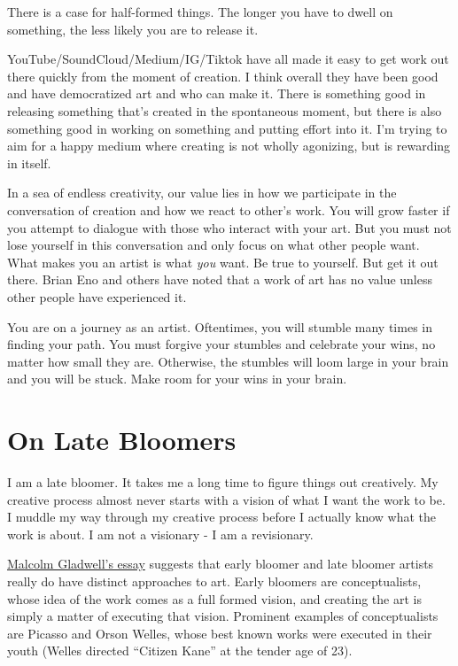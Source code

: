 \documentclass[
]{book}
\begin{document}
There is a case for half-formed things. The longer you have to dwell on something, the less likely you are to release it.

YouTube/SoundCloud/Medium/IG/Tiktok have all made it easy to get work out there quickly from the moment of creation. I think overall they have been good and have democratized art and who can make it. There is something good in releasing something that's created in the spontaneous moment, but there is also something good in working on something and putting effort into it. I'm trying to aim for a happy medium where creating is not wholly agonizing, but is rewarding in itself.

In a sea of endless creativity, our value lies in how we participate in the conversation of creation and how we react to other's work. You will grow faster if you attempt to dialogue with those who interact with your art. But you must not lose yourself in this conversation and only focus on what other people want. What makes you an artist is what \emph{you} want. Be true to yourself. But get it out there. Brian Eno and others have noted that a work of art has no value unless other people have experienced it.

You are on a journey as an artist. Oftentimes, you will stumble many times in finding your path. You must forgive your stumbles and celebrate your wins, no matter how small they are. Otherwise, the stumbles will loom large in your brain and you will be stuck. Make room for your wins in your brain.

\hypertarget{on-late-bloomers}{%
\chapter{On Late Bloomers}\label{on-late-bloomers}}

I am a late bloomer. It takes me a long time to figure things out creatively. My creative process almost never starts with a vision of what I want the work to be. I muddle my way through my creative process before I actually know what the work is about. I am not a visionary - I am a revisionary.

\href{http://www.newyorker.com/magazine/2008/10/20/late-bloomers-2}{Malcolm Gladwell's essay} suggests that early bloomer and late bloomer artists really do have distinct approaches to art. Early bloomers are conceptualists, whose idea of the work comes as a full formed vision, and creating the art is simply a matter of executing that vision. Prominent examples of conceptualists are Picasso and Orson Welles, whose best known works were executed in their youth (Welles directed ``Citizen Kane'' at the tender age of 23).
\end{document}
